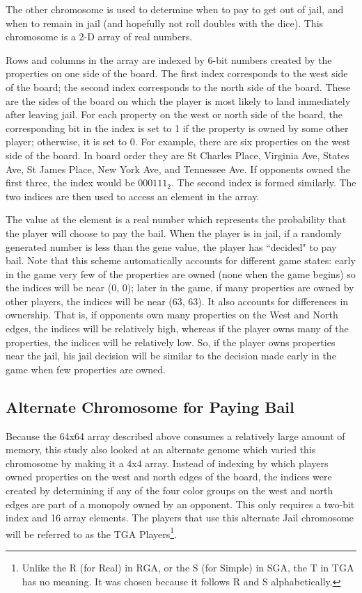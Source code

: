 The other chromosome is used to determine when to pay to get out of jail, and
when to remain in jail (and hopefully not roll doubles with the dice).
This chromosome is a 2-D array of real numbers.

Rows and columns in the array are indexed by 6-bit numbers created by the
properties on one side of the board. The first index corresponds to the west
side of the board; the second index corresponds to the north side of the board.
These are the sides of the board on which the player is most likely to land
immediately after leaving jail. For each property on the west or north side of
the board, the corresponding bit in the index is set to 1 if the property is
owned by some other player; otherwise, it is set to 0. For example, there are
six properties on the west side of the board. In board order they are St Charles
Place, Virginia Ave, States Ave, St James Place, New York Ave, and Tennessee
Ave. If opponents owned the first three, the index would be $000111_2$. The
second index is formed similarly. The two indices are then used to access an
element in the array.

The value at the element is a real number which represents the probability that
the player will choose to pay the bail. When the player is in jail, if a
randomly generated number is less than the gene value, the player has ``decided"
to pay bail. Note that this scheme automatically accounts for different game
states:
early in the game very few of the properties are owned (none when the game
begins) so the indices will be near (0, 0); later in the game, if many
properties are owned by other players, the indices will be near (63, 63). It
also accounts for differences in ownership. That is, if opponents own many
properties on the West and North edges, the indices will be relatively high,
whereas if the player owns many of the properties, the indices will be
relatively low. So, if the player owns properties near the jail, his jail
decision will be similar to the decision made early in the game when few
properties are owned.

\subsection{Alternate Chromosome for Paying Bail} \label{5_altjail}

Because the 64x64 array described above consumes a relatively large amount of
memory, this study also looked at an alternate genome which varied this
chromosome by making it a 4x4 array. Instead of indexing by which players owned
properties on the west and north edges of the board, the indices were created by
determining if any of the four color groups on the west and north edges are part
of a monopoly owned by an opponent. This only requires a two-bit index and 16
array elements. The players that use this alternate Jail chromosome will be
referred to as the TGA Players\footnote{Unlike the R (for Real) in RGA, or the S
(for Simple) in SGA, the T in TGA has no meaning. It was chosen because it
follows R and S alphabetically.}.

